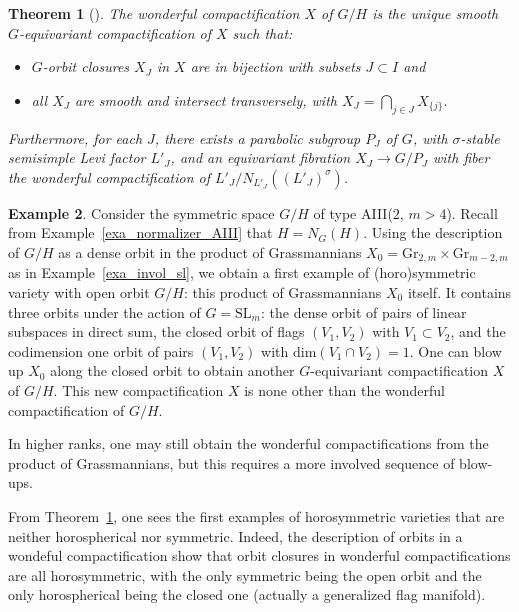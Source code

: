 \documentclass{amsart}
\newtheorem{thm}{Theorem}[section]
\theoremstyle{definition}
\newtheorem{exa}[thm]{Example}
\begin{document}
\begin{thm}[{\cite{DCP83}}]
\label{thm_dcp83}
The wonderful compactification $X$ of $G/H$ is the unique smooth $G$-equivariant 
compactification of $X$ such that:
\begin{itemize} 
\item $G$-orbit closures $X_J$ in $X$ are in bijection with subsets $J\subset I$ and 
\item all $X_J$ are smooth and intersect transversely, with $X_{J}=\bigcap_{j\in J} X_{\{j\}}$.
\end{itemize}  
Furthermore, for each $J$, there exists a parabolic subgroup $P_J$ of $G$, with $\sigma$-stable 
semisimple Levi factor $L'_J$, and an equivariant fibration $X_J\rightarrow G/P_J$ 
with fiber the wonderful compactification of $L'_J/N_{L'_J}((L'_J)^{\sigma})$.
\end{thm}

\begin{exa}
\label{exa_wonderful_AIII}
Consider the symmetric space $G/H$ of type AIII($2$, $m>4$).
Recall from Example~\ref{exa_normalizer_AIII} that $H=N_G(H)$. Using the description of $G/H$ as a dense 
orbit in the product of Grassmannians 
$X_0=\mathrm{Gr}_{2,m}\times \mathrm{Gr}_{m-2,m}$ as in Example~\ref{exa_invol_sl},
we obtain a first example of (horo)symmetric variety with open orbit 
$G/H$: this product of Grassmannians $X_0$ itself. 
It contains three orbits under the action of $G=\mathrm{SL}_m$: the dense 
orbit of pairs of linear subspaces in direct sum, the closed 
orbit of flags $(V_1,V_2)$ with $V_1\subset V_2$, and the codimension one orbit 
of pairs $(V_1,V_2)$ with $\mathrm{dim}(V_1\cap V_2)=1$.
One can blow up $X_0$ along the closed orbit to obtain another 
$G$-equivariant compactification $X$ of $G/H$. This new 
compactification $X$ is none other than the wonderful compactification 
of $G/H$. 
\end{exa}

In higher ranks, one may still obtain the wonderful compactifications 
from the product of Grassmannians, but this requires a more 
involved sequence of blow-ups.

From Theorem~\ref{thm_dcp83}, one sees the first 
examples of horosymmetric varieties that are neither horospherical 
nor symmetric. Indeed, the description of orbits in a wondeful 
compactification show that orbit closures in wonderful compactifications 
are all horosymmetric, with the only symmetric being the open orbit and 
the only horospherical being the closed one (actually a generalized flag 
manifold).
\end{document}
